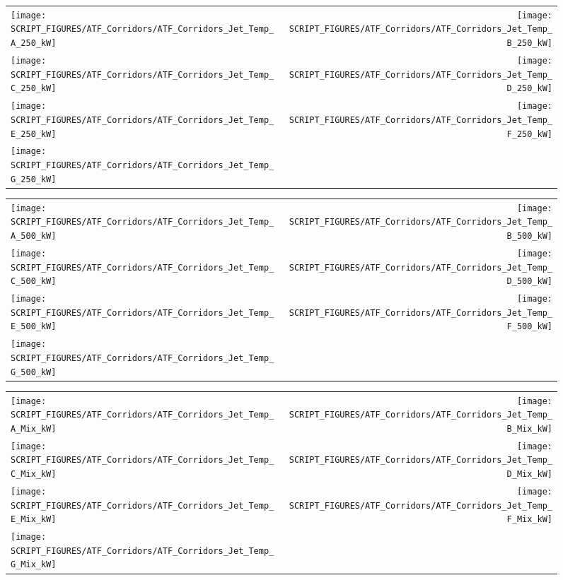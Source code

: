 \begin{figure}[p]
\begin{tabular*}{\textwidth}{l@{\extracolsep{\fill}}r}
\texttt{[image: SCRIPT\_FIGURES/ATF\_Corridors/ATF\_Corridors\_Jet\_Temp\_A\_250\_kW]} &
\texttt{[image: SCRIPT\_FIGURES/ATF\_Corridors/ATF\_Corridors\_Jet\_Temp\_B\_250\_kW]} \\
\texttt{[image: SCRIPT\_FIGURES/ATF\_Corridors/ATF\_Corridors\_Jet\_Temp\_C\_250\_kW]} &
\texttt{[image: SCRIPT\_FIGURES/ATF\_Corridors/ATF\_Corridors\_Jet\_Temp\_D\_250\_kW]} \\
\texttt{[image: SCRIPT\_FIGURES/ATF\_Corridors/ATF\_Corridors\_Jet\_Temp\_E\_250\_kW]} &
\texttt{[image: SCRIPT\_FIGURES/ATF\_Corridors/ATF\_Corridors\_Jet\_Temp\_F\_250\_kW]} \\
\texttt{[image: SCRIPT\_FIGURES/ATF\_Corridors/ATF\_Corridors\_Jet\_Temp\_G\_250\_kW]} &
\end{tabular*}
\label{ATF_Corridors_Jet_Temp_250_kW}
\end{figure}

\begin{figure}[p]
\begin{tabular*}{\textwidth}{l@{\extracolsep{\fill}}r}
\texttt{[image: SCRIPT\_FIGURES/ATF\_Corridors/ATF\_Corridors\_Jet\_Temp\_A\_500\_kW]} &
\texttt{[image: SCRIPT\_FIGURES/ATF\_Corridors/ATF\_Corridors\_Jet\_Temp\_B\_500\_kW]} \\
\texttt{[image: SCRIPT\_FIGURES/ATF\_Corridors/ATF\_Corridors\_Jet\_Temp\_C\_500\_kW]} &
\texttt{[image: SCRIPT\_FIGURES/ATF\_Corridors/ATF\_Corridors\_Jet\_Temp\_D\_500\_kW]} \\
\texttt{[image: SCRIPT\_FIGURES/ATF\_Corridors/ATF\_Corridors\_Jet\_Temp\_E\_500\_kW]} &
\texttt{[image: SCRIPT\_FIGURES/ATF\_Corridors/ATF\_Corridors\_Jet\_Temp\_F\_500\_kW]} \\
\texttt{[image: SCRIPT\_FIGURES/ATF\_Corridors/ATF\_Corridors\_Jet\_Temp\_G\_500\_kW]} &
\end{tabular*}
\label{ATF_Corridors_Jet_Temp_500_kW}
\end{figure}

\begin{figure}[p]
\begin{tabular*}{\textwidth}{l@{\extracolsep{\fill}}r}
\texttt{[image: SCRIPT\_FIGURES/ATF\_Corridors/ATF\_Corridors\_Jet\_Temp\_A\_Mix\_kW]} &
\texttt{[image: SCRIPT\_FIGURES/ATF\_Corridors/ATF\_Corridors\_Jet\_Temp\_B\_Mix\_kW]} \\
\texttt{[image: SCRIPT\_FIGURES/ATF\_Corridors/ATF\_Corridors\_Jet\_Temp\_C\_Mix\_kW]} &
\texttt{[image: SCRIPT\_FIGURES/ATF\_Corridors/ATF\_Corridors\_Jet\_Temp\_D\_Mix\_kW]} \\
\texttt{[image: SCRIPT\_FIGURES/ATF\_Corridors/ATF\_Corridors\_Jet\_Temp\_E\_Mix\_kW]} &
\texttt{[image: SCRIPT\_FIGURES/ATF\_Corridors/ATF\_Corridors\_Jet\_Temp\_F\_Mix\_kW]} \\
\texttt{[image: SCRIPT\_FIGURES/ATF\_Corridors/ATF\_Corridors\_Jet\_Temp\_G\_Mix\_kW]} &
\end{tabular*}
\label{ATF_Corridors_Jet_Temp_Mix_kW}
\end{figure}


